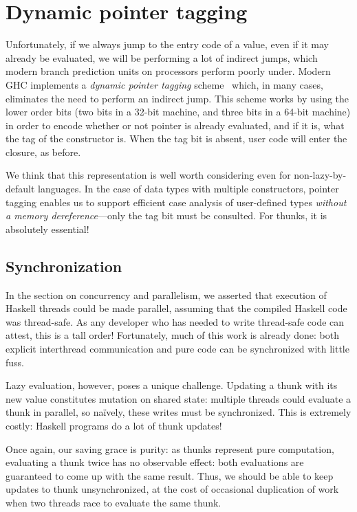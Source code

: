 \section{Dynamic pointer tagging}

Unfortunately, if we always jump to the entry code of a value, even
if it may already be evaluated, we will be performing a lot of indirect jumps,
which modern branch prediction units on processors perform
poorly under.  Modern GHC implements a
\emph{dynamic pointer tagging} scheme~\XXX{} which, in many cases,
eliminates the need to perform an indirect jump.  This scheme works by
using the lower order bits (two bits in a 32-bit machine, and three bits
in a 64-bit machine) in order to encode whether or not pointer is
already evaluated, and if it is, what the tag of the constructor is.
When the tag bit is absent, user code will enter the closure, as before.

We think that this representation is well worth considering even for
non-lazy-by-default languages.  In the case of data types with multiple
constructors, pointer tagging enables us to support efficient case
analysis of user-defined types \emph{without a memory
dereference}---only the tag bit must be consulted.  For thunks,
it is absolutely essential!

\subsection{Synchronization} \label{sec:sync}

In the section on concurrency and parallelism, we asserted that
execution of Haskell threads could be made parallel, assuming that the
compiled Haskell code was thread-safe.  As any developer who has needed
to write thread-safe code can attest, this is a tall order!
Fortunately, much of this work is already done: both explicit interthread
communication and pure code can be synchronized with little fuss.

Lazy evaluation, however, poses a unique challenge.  Updating a thunk
with its new value constitutes mutation on shared state: multiple
threads could evaluate a thunk in parallel, so na\"ively, these writes
must be synchronized.  This is extremely costly: Haskell programs do a
lot of thunk updates!

Once again, our saving grace is purity: as thunks represent pure
computation, evaluating a thunk twice has no observable effect: both
evaluations are guaranteed to come up with the same result.  Thus, we
should be able to keep updates to thunk unsynchronized, at the cost of
occasional duplication of work when two threads race to evaluate the
same thunk.

